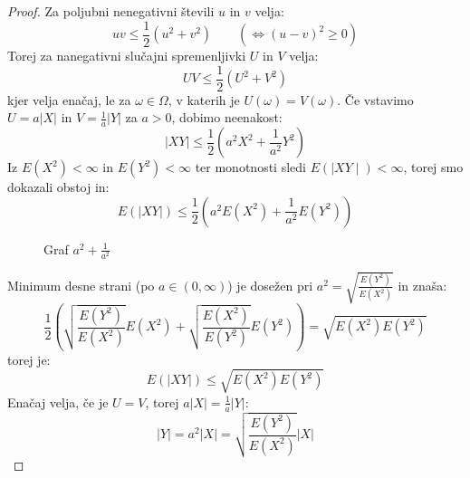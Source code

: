 \documentclass[12pt]{book}
\def\n{\noindent}
\theoremstyle{definition}
\theoremstyle{plain}
\theoremstyle{plain}
\theoremstyle{plain}
\theoremstyle{plain}
\theoremstyle{remark}
\begin{document}
\begin{proof}
    Za poljubni nenegativni števili $u$ in $v$ velja: 
    $$
    u v \leq \frac{1}{2}\left(u^2+v^2\right) \qquad \left(\iff (u-v)^2 \geq 0 \right)
    $$
    Torej za nanegativni slučajni spremenljivki $U$ in $V$ velja:
    $$
    U V \leq \frac{1}{2}\left(U^2+V^2\right)
    $$
    kjer velja enačaj, le za $\omega \in \Omega$, v katerih je $U(\omega) = V(\omega)$. Če vstavimo $U=a|X|$ in $V=\frac{1}{a} |Y|$ za $a>0$, dobimo neenakost: 
    $$
    |X Y| \leq \frac{1}{2}\left(a^2 X^2+\frac{1}{a^2} Y^2\right)
    $$
    Iz $E\left(X^2\right)<\infty$ in $E\left(Y^2\right)<\infty$ ter monotnosti sledi $E(\mid X Y \mid)<\infty$, torej smo dokazali obstoj in:
    $$
    E(|XY|) \leq \frac{1}{2}\left(a^2 E\left(X^2\right)+\frac{1}{a^2} E\left(Y^2\right)\right)
    $$  

    \begin{figure}[H]
        \centering

        \caption{Graf $a^2 + \frac{1}{a^2}$}
        \label{fig:8}
    \end{figure}

    \n Minimum desne strani (po $a \in (0, \infty)$) je dosežen pri $a^2=\sqrt{\frac{E\left(Y^2\right)}{E\left(X^2\right)}}$ in znaša: 
    $$
    \frac{1}{2}\left(\sqrt{\frac{E\left(Y^2\right)}{E\left(X^2\right)}}  E\left(X^2\right)+\sqrt{\frac{E\left(X^2\right)}{E\left(Y^2\right)}}  E\left(Y^2\right)\right) = \sqrt{E\left(X^2\right) E\left(Y^2\right)}
    $$
    torej je: 
    $$
    E(|X Y|) \leq \sqrt{E\left(X^2\right) E\left(Y^2\right)}
    $$
    Enačaj velja, če je $U = V$, torej  $a |X|= \frac{1}{a}|Y|$:
    $$
    |Y|=a^2 |X|=\sqrt{\frac{E\left(Y^2\right)}{E\left(X^2\right)}} |X|
    $$
\end{proof}
\end{document}
